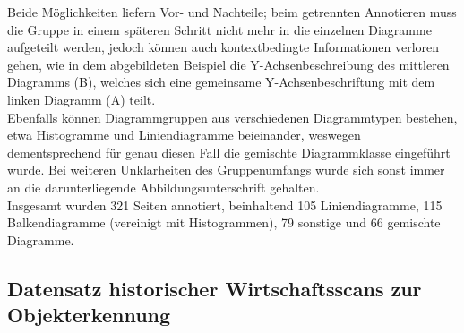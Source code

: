 Beide Möglichkeiten liefern Vor- und Nachteile; beim getrennten Annotieren muss die Gruppe in einem späteren Schritt nicht mehr in die einzelnen Diagramme aufgeteilt werden, jedoch können auch kontextbedingte Informationen verloren gehen, wie in dem abgebildeten Beispiel die Y-Achsenbeschreibung des mittleren Diagramms (B), welches sich eine gemeinsame Y-Achsenbeschriftung mit dem linken Diagramm (A) teilt.
\\
Ebenfalls können Diagrammgruppen aus verschiedenen Diagrammtypen bestehen, etwa Histogramme und Liniendiagramme beieinander, weswegen dementsprechend für genau diesen Fall die gemischte Diagrammklasse eingeführt wurde. Bei weiteren Unklarheiten des Gruppenumfangs wurde sich sonst immer an die darunterliegende Abbildungsunterschrift gehalten.
\\
Insgesamt wurden 321 Seiten annotiert, beinhaltend 105 Liniendiagramme, 115 Balkendiagramme (vereinigt mit Histogrammen), 79 sonstige und 66 gemischte Diagramme.

\subsection{Datensatz historischer Wirtschaftsscans zur Objekterkennung}
\label{ch:scanbank}

